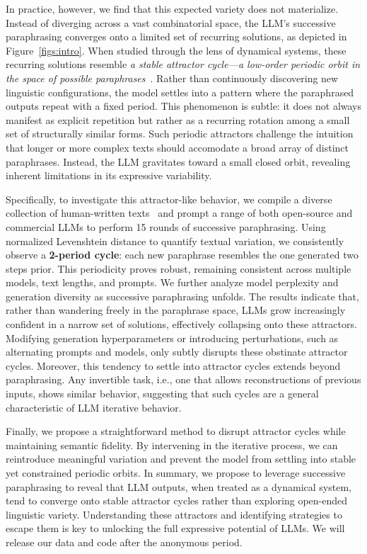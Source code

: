 In practice, however, we find that this expected variety does not materialize. 
Instead of diverging across a vast combinatorial space, the LLM’s successive paraphrasing converges onto a limited set of recurring solutions, as depicted in Figure~\ref{figs:intro}. 
When studied through the lens of dynamical systems, these recurring solutions resemble \textit{a stable attractor cycle—a low-order periodic orbit in the space of possible paraphrases}~\cite{attractor1}. 
Rather than continuously discovering new linguistic configurations, the model settles into a pattern where the paraphrased outputs repeat with a fixed period. 
This phenomenon is subtle: it does not always manifest as explicit repetition but rather as a recurring rotation among a small set of structurally similar forms. 
Such periodic attractors challenge the intuition that longer or more complex texts should accomodate a broad array of distinct paraphrases. 
Instead, the LLM gravitates toward a small closed orbit, revealing inherent limitations in its expressive variability.


Specifically, to investigate this attractor-like behavior, we compile a diverse collection of human-written texts~\cite{li2023mage} and prompt a range of both open-source and commercial LLMs to perform 15 rounds of successive paraphrasing. 
Using normalized Levenshtein distance to quantify textual variation, we consistently observe a \textbf{2-period cycle}: each new paraphrase resembles the one generated two steps prior. 
This periodicity proves robust, remaining consistent across multiple models, text lengths, and prompts.
We further analyze model perplexity and generation diversity as successive paraphrasing unfolds. 
The results indicate that, rather than wandering freely in the paraphrase space, LLMs grow increasingly confident in a narrow set of solutions, effectively collapsing onto these attractors. 
Modifying generation hyperparameters or introducing perturbations, such as alternating prompts and models, only subtly disrupts these obstinate attractor cycles.
Moreover, this tendency to settle into attractor cycles extends beyond paraphrasing. Any invertible task, i.e., one that allows reconstructions of previous inputs, shows similar behavior, suggesting that such cycles are a general characteristic of LLM iterative behavior.


Finally, we propose a straightforward method to disrupt attractor cycles while maintaining semantic fidelity.
By intervening in the iterative process, we can reintroduce meaningful variation and prevent the model from settling into stable yet constrained periodic orbits.
In summary, we propose to leverage successive paraphrasing to reveal that LLM outputs, when treated as a dynamical system, tend to converge onto stable attractor cycles rather than exploring open-ended linguistic variety. 
Understanding these attractors and identifying strategies to escape them is key to unlocking the full expressive potential of LLMs.
We will release our data and code after the anonymous period.
